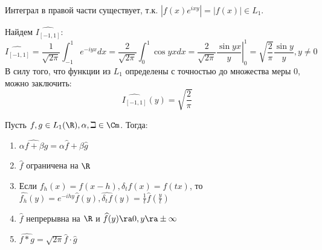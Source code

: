 \begin{note}
    Интеграл в правой части существует, т.к. \(|f(x)e^{ixy}| = |f(x)| \in L_1\).
\end{note}

\begin{example}
    Найдем \(\widehat{I_{[-1, 1]}}\):
    \[\widehat{I_{[-1, 1]}} = \frac{1}{\sqrt{2\pi}}\int_{-1}^1 e^{-iyx}dx = \frac{2}{\sqrt{2\pi}}\int_0^1\cos yx dx = \left.\frac{2}{\sqrt{2\pi}}\frac{\sin yx}{y}\right|_0^1 = \sqrt{\frac{2}{\pi}}\frac{\sin y}{y}, y \ne 0\]
    В силу того, что функции из \(L_1\) определены с точностью до множества меры \(0\), можно заключить:
    \[\widehat{I_{[-1, 1]}}(y) = \sqrt{\frac{2}{\pi}}\]
\end{example}

\begin{proposition}
    Пусть \(f, g \in L_1(\R), \alpha, \beth \in \Cm\). Тогда:
    \begin{enumerate}
        \item \(\widehat{\alpha f + \beta g} = \alpha\widehat{f} + \beta\widehat{g}\)
        \item \(\widehat{f}\) ограничена на \(\R\)
        \item Если \(f_h(x) = f(x - h), \delta_tf(x) = f(tx)\), то \(\widehat{f_h}(y) = e^{-ihy}\widehat{f}(y), \widehat{\delta_tf}(y) = \frac{1}{t}\widehat{f}\left( \frac{y}{t} \right)\)
        \item \(\widehat{f}\) непрерывна на \(\R\) и \(\widehat{f}(y) \ra 0, y \ra \pm\infty\)
        \item \(\widehat{f * g} = \sqrt{2\pi}\widehat{f}\cdot\widehat{g}\)
    \end{enumerate}
\end{proposition}
